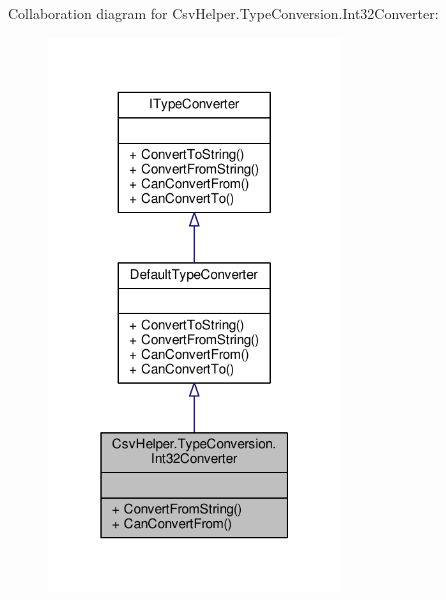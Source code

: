 Collaboration diagram for Csv\-Helper.\-Type\-Conversion.\-Int32\-Converter\-:
\nopagebreak
\begin{figure}[H]
\begin{center}
\leavevmode
\includegraphics[width=220pt]{d5/d26/a00474}
\end{center}
\end{figure}
